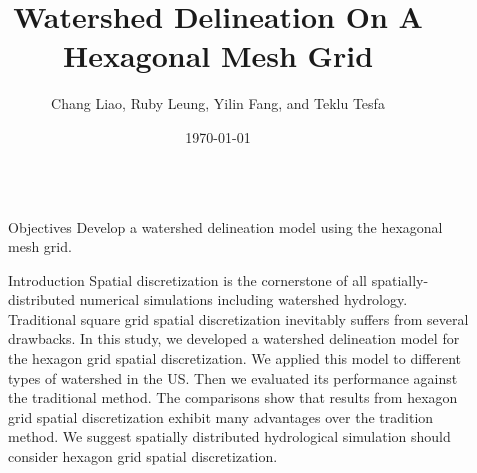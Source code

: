 \documentclass[final]{beamer}
\title{ \huge{Watershed Delineation On A Hexagonal Mesh Grid}}
\author{ \Large{ \hspace{0.5in} Chang Liao, Ruby Leung, Yilin Fang, and Teklu Tesfa } }
\institute[ETH]{
  \large{ \hspace{0.5in} Pacific Northwest National Laboratory }}
\date{\today}
\newlength{\sepwid}
\newlength{\onecolwid}
\begin{document}
\setlength{\belowcaptionskip}{1ex} %
\setlength\belowdisplayshortskip{1ex} %
\begin{frame}[t] %
  \begin{columns}[t] %
    \begin{column}{\sepwid}
    \end{column} %
    \begin{column}{\sepwid}
    \end{column} %
    \begin{column}{\onecolwid} %
      \vspace{2.0in} %
      
      \begin{alertblock}{Objectives}
        Develop a watershed delineation model using the hexagonal mesh grid.
      \end{alertblock}
      \begin{block}{Introduction}
        \normalsize{Spatial discretization is the cornerstone of all spatially-distributed numerical simulations including watershed hydrology. Traditional square grid spatial discretization inevitably suffers from several drawbacks. In this study, we developed a watershed delineation model for the hexagon grid spatial discretization. We applied this model to different types of watershed in the US. Then we evaluated its performance against the traditional method. The comparisons show that results from hexagon grid spatial discretization exhibit many advantages over the tradition method. We suggest spatially distributed hydrological simulation should consider hexagon grid spatial discretization.
        }
      \end{block}


\end{column}
\end{columns}
\end{frame}
\end{document}
